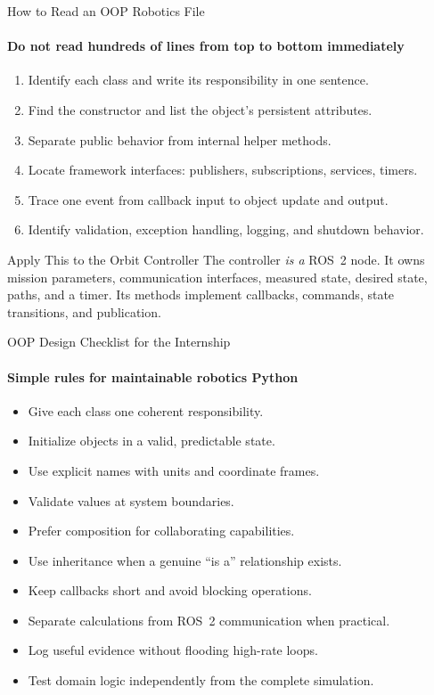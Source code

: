\begin{frame}{How to Read an OOP Robotics File}
\framesubtitle{Do not read hundreds of lines from top to bottom immediately}

\begin{enumerate}
    \item Identify each class and write its responsibility in one sentence.
    \item Find the constructor and list the object's persistent attributes.
    \item Separate public behavior from internal helper methods.
    \item Locate framework interfaces: publishers, subscriptions, services, timers.
    \item Trace one event from callback input to object update and output.
    \item Identify validation, exception handling, logging, and shutdown behavior.
\end{enumerate}

\begin{exampleblock}{Apply This to the Orbit Controller}
    The controller \textit{is a} ROS~2 node. It owns mission parameters,
    communication interfaces, measured state, desired state, paths, and a timer.
    Its methods implement callbacks, commands, state transitions, and publication.
\end{exampleblock}
\end{frame}


\begin{frame}{OOP Design Checklist for the Internship}
\framesubtitle{Simple rules for maintainable robotics Python}

\begin{itemize}
    \item Give each class one coherent responsibility.
    \item Initialize objects in a valid, predictable state.
    \item Use explicit names with units and coordinate frames.
    \item Validate values at system boundaries.
    \item Prefer composition for collaborating capabilities.
    \item Use inheritance when a genuine ``is a'' relationship exists.
    \item Keep callbacks short and avoid blocking operations.
    \item Separate calculations from ROS~2 communication when practical.
    \item Log useful evidence without flooding high-rate loops.
    \item Test domain logic independently from the complete simulation.
\end{itemize}
\end{frame}


